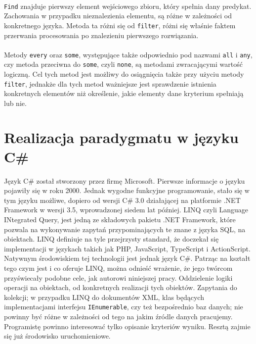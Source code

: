 \documentclass[a4paper,10pt]{report}
\begin{document}
\paragraph{}
\verb|Find| znajduje pierwszy element wejściowego zbioru, który spełnia dany predykat. Zachowania w przypadku nieznalezienia elementu, są różne w zależności od konkretnego języka. Metoda ta różni się od \verb|filter|, różni się właśnie faktem przerwania procesowania po znalezieniu pierwszego rozwiązania.
\paragraph{}
Metody \verb|every| oraz \verb|some|, występujące także odpowiednio pod nazwami \verb|all| i \verb|any|, czy metoda przeciwna do \verb|some|, czyli \verb|none|, są metodami zwracającymi wartość logiczną. Cel tych metod jest możliwy do osiągnięcia także przy użyciu metody \verb|filter|, jednakże dla tych metod ważniejsze jest sprawdzenie istnienia konkretnych elementów niż określenie, jakie elementy dane kryterium spełniają lub nie.
\section{Realizacja paradygmatu w języku C\#}
\paragraph{}
Język C\# został stworzony przez firmę Microsoft. Pierwsze informacje o języku pojawiły się w roku 2000. Jednak wygodne funkcyjne programowanie, stało się w tym języku możliwe, dopiero od wersji C\# 3.0 działającej na platformie .NET Framework w wersji 3.5, wprowadzonej siedem lat później. LINQ czyli Language INtegrated Query, jest jedną ze składowych pakietu .NET Framework, które pozwala na wykonywanie zapytań przypominających te znane z języka SQL, na obiektach. LINQ definiuje na tyle przejrzysty standard, że doczekał się implementacji w językach takich jak PHP, JavaScript, TypeScript i ActionScript. Natywnym środowiskiem tej technologii jest jednak język C\#. Patrząc na kształt tego czym jest i co oferuje LINQ, można odnieść wrażenie, że jego twórcom przyświecały podobne cele, jak autorowi niniejszej pracy. Oddzielenie logiki operacji na obiektach, od konkretnych realizacji tych obiektów. Zapytania do kolekcji; w przypadku LINQ do dokumentów XML, klas będących implementacjami interfejsu \verb|IEnumerable|, czy też bezpośrednio baz danych; nie powinny być różne w zależności od tego na jakim źródle danych pracujemy. Programistę powinno interesować tylko opisanie kryteriów wyniku. Resztą zajmie się już środowisko uruchomieniowe.
\end{document}
